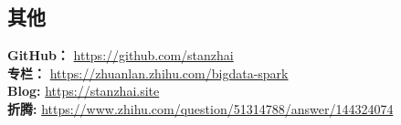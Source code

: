 \documentclass[UTF8,margin,line]{res}
\begin{document}
\begin{resume}
\section{\sc 其他}
\textbf{GitHub：} \url{https://github.com/stanzhai} \\
\textbf{专栏：} \url{https://zhuanlan.zhihu.com/bigdata-spark} \\
\textbf{Blog: } \url{https://stanzhai.site} \\
\textbf{折腾: } \url{https://www.zhihu.com/question/51314788/answer/144324074} \\

\end{resume}
\end{document}
